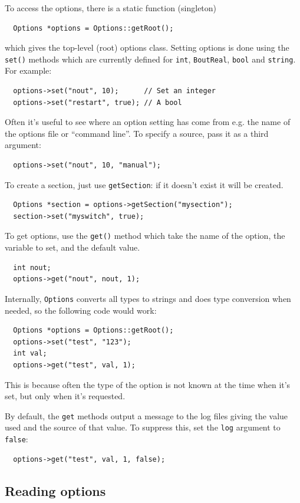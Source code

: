 \documentclass[12pt]{article}
\begin{document}
To access the options, there is a static function (singleton)
\begin{lstlisting}
  Options *options = Options::getRoot();
\end{lstlisting}
which gives the top-level (root) options class. Setting options
is done using the \lstinline!set()! methods which are currently
defined for \lstinline!int!, \lstinline!BoutReal!, \lstinline!bool! and
\lstinline!string!. For example:
\begin{lstlisting}
  options->set("nout", 10);      // Set an integer
  options->set("restart", true); // A bool
\end{lstlisting}
Often it's useful to see where an option setting has come from
e.g. the name of the options file or ``command line''. To specify
a source, pass it as a third argument:
\begin{lstlisting}
  options->set("nout", 10, "manual");
\end{lstlisting}
To create a section, just use \lstinline!getSection!: if it doesn't
exist it will be created.
\begin{lstlisting}
  Options *section = options->getSection("mysection");
  section->set("myswitch", true);
\end{lstlisting}

To get options, use the \lstinline!get()! method which take
the name of the option, the variable to set, and the default value.
\begin{lstlisting}
  int nout;
  options->get("nout", nout, 1);
\end{lstlisting}
Internally, \lstinline!Options! converts all types to strings
and does type conversion when needed, so the following code would work:
\begin{lstlisting}
  Options *options = Options::getRoot();
  options->set("test", "123");
  int val;
  options->get("test", val, 1);
\end{lstlisting}
This is because often the type of the option is not known
at the time when it's set, but only when it's requested.

By default, the \lstinline!get! methods output a message to
the log files giving the value used and the source of that value.
To suppress this, set the \lstinline!log! argument to \lstinline!false!:
\begin{lstlisting}
  options->get("test", val, 1, false);
\end{lstlisting}

\subsection{Reading options}
\end{document}
